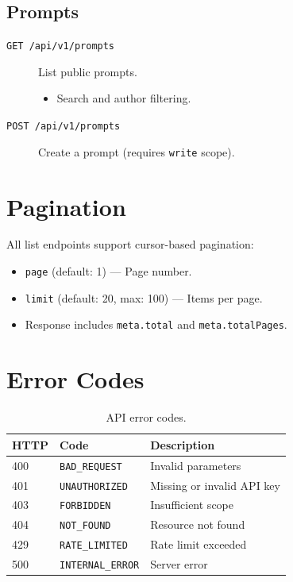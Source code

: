 \subsection{Prompts}

\begin{description}
  \item[\texttt{GET /api/v1/prompts}] List public prompts.
  \begin{itemize}
    \item Search and author filtering.
  \end{itemize}

  \item[\texttt{POST /api/v1/prompts}] Create a prompt (requires \texttt{write} scope).
\end{description}

\section{Pagination}
\label{sec:api:pagination}

All list endpoints support cursor-based pagination:

\begin{itemize}
  \item \texttt{page} (default: 1) --- Page number.
  \item \texttt{limit} (default: 20, max: 100) --- Items per page.
  \item Response includes \texttt{meta.total} and \texttt{meta.totalPages}.
\end{itemize}

\section{Error Codes}
\label{sec:api:errors}

\begin{table}[H]
\centering
\caption{API error codes.}
\label{tab:api-errors}
\begin{tabular}{lll}
\toprule
\textbf{HTTP} & \textbf{Code} & \textbf{Description} \\
\midrule
400 & \texttt{BAD\_REQUEST} & Invalid parameters \\
401 & \texttt{UNAUTHORIZED} & Missing or invalid API key \\
403 & \texttt{FORBIDDEN} & Insufficient scope \\
404 & \texttt{NOT\_FOUND} & Resource not found \\
429 & \texttt{RATE\_LIMITED} & Rate limit exceeded \\
500 & \texttt{INTERNAL\_ERROR} & Server error \\
\bottomrule
\end{tabular}
\end{table}


